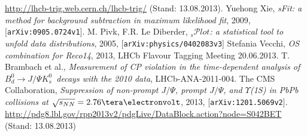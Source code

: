 \documentclass[ a4paper,
                12pt, 
                twoside, 
                chapterprefix, 
              ]{scrreprt}
\newcommand{\Decaychannel}{$B_d^0 \rightarrow J/\Psi K_s^0$}
\newcommand{\SPlot}{$_s\mathcal{P}lot$}
\begin{document}
\begin{thebibliography}{---}
 \url{http://lhcb-trig.web.cern.ch/lhcb-trig/} (Stand: 13.08.2013).
 Yuehong Xie, \textit{sFit: a method for background subtraction in maximum likelihood fit}, 2009, [\texttt{arXiv:0905.0724v1}].
 M. Pivk, F.R. Le Diberder, \SPlot\textit{: a statistical tool to unfold data distributions}, 2005, [\texttt{arXiv:physics/0402083v3}]
 Stefania Vecchi, \textit{OS combination for Reco14}, 2013, LHCb Flavour Tagging Meeting 20.06.2013.
 T. Brambach et al., \textit{Measurement of CP violation in the time-dependent analysis of \Decaychannel\ decays with the 2010 data}, LHCb-ANA-2011-004.
 The CMS Collaboration, \textit{Suppression of non-prompt $J/\Psi$, prompt $J/\Psi$, and $\Upsilon$(1S)
in PbPb collisions at $\sqrt{s_{NN}} = 2.76 \tera\electronvolt$}, 2013, [\texttt{arXiv:1201.5069v2}].
 \url{http://pdg8.lbl.gov/rpp2013v2/pdgLive/DataBlock.action?node=S042BET} (Stand: 13.08.2013)
\end{thebibliography}


\end{document}
